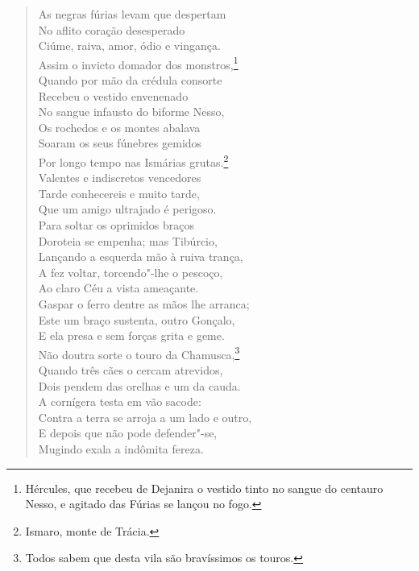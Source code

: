 \begin{verse}
As negras fúrias levam que despertam\\
No aflito coração desesperado\\
Ciúme, raiva, amor, ódio e vingança.\\
Assim o invicto domador dos monstros,\footnote{ Hércules, que recebeu
de Dejanira o vestido tinto no sangue do centauro Nesso, e agitado das Fúrias se
lançou no fogo.}\\
Quando por mão da crédula consorte\\
Recebeu o vestido envenenado\\
No sangue infausto do biforme Nesso,\\
Os rochedos e os montes abalava\\ 
Soaram os seus fúnebres gemidos\\
Por longo tempo nas Ismárias grutas.\footnote{ Ismaro, monte de Trácia.}\\
Valentes e indiscretos vencedores\\
Tarde conhecereis e muito tarde,\\
Que um amigo ultrajado é perigoso. \\[10pt]


Para soltar os oprimidos braços\\
Doroteia se empenha; mas Tibúrcio,\\
Lançando a esquerda mão à ruiva trança,\\
A fez voltar, torcendo"-lhe o pescoço,\\
Ao claro Céu a vista ameaçante.\\
Gaspar o ferro dentre as mãos lhe arranca;\\
Este um braço sustenta, outro Gonçalo,\\
E ela presa e sem forças grita e geme.\\
Não doutra sorte o touro da Chamusca,\footnote{ Todos sabem que desta
vila são bravíssimos os touros.}\\
Quando três cães o cercam atrevidos,\\
Dois pendem das orelhas e um da cauda.\\
A cornígera testa em vão sacode:\\
Contra a terra se arroja a um lado e outro,\\
E depois que não pode defender"-se,\\
Mugindo exala a indômita fereza. \\[10pt]
\end{verse}

\pagebreak
\thispagestyle{empty}

